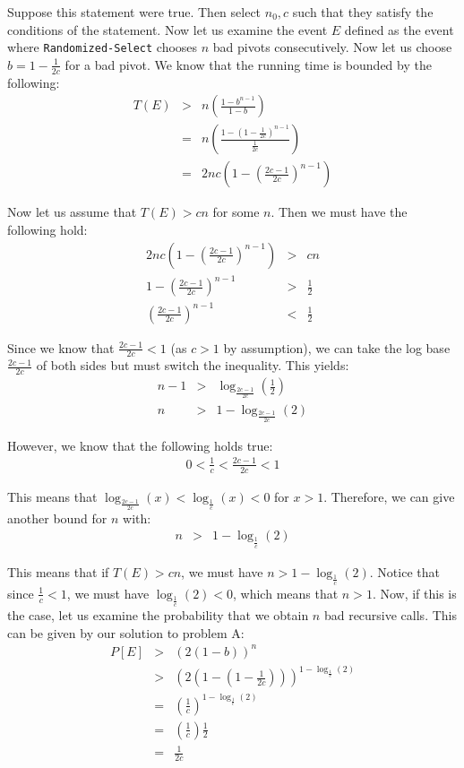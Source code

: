\documentclass[psamsfonts]{amsart}
\newenvironment{sol}{{\bfseries Solution}}{\qedsymbol}
\theoremstyle{definition}
\theoremstyle{remark}
\numberwithin{equation}{section}
\begin{document}
\begin{sol}
Suppose this statement were true. Then select $n_0, c$ such that they satisfy the conditions of the statement. Now let us examine the event $E$ defined as the event where \texttt{Randomized-Select} chooses $n$ bad pivots consecutively. Now let us choose $b = 1 - \frac{1}{2c}$ for a bad pivot. We know that the running time is bounded by the following:
\begin{eqnarray}
T(E) &>& n \left( \frac{1 - b^{n-1}}{1 - b} \right) \\
&=& n \left( \frac{1 - (1 - \frac{1}{2c})^{n-1}}{\frac{1}{2c}} \right) \\
&=& 2nc \left(1 - \left(\frac{2c - 1}{2c}\right)^{n-1} \right)
\end{eqnarray} 

Now let us assume that $T(E) > cn$ for some $n$. Then we must have the following hold:
\begin{eqnarray}
2nc \left(1 - \left(\frac{2c - 1}{2c}\right)^{n-1} \right) &>& cn \\
1 - \left(\frac{2c - 1}{2c}\right)^{n-1}&>& \frac{1}{2} \\
\left(\frac{2c - 1}{2c}\right)^{n-1} &<& \frac{1}{2}
\end{eqnarray}

Since we know that $\frac{2c-1}{2c} < 1$ (as $c > 1$ by assumption), we can take the log base $\frac{2c - 1}{2c}$ of both sides but must switch the inequality. This yields:
\begin{eqnarray}
n - 1 &>& \log_{\frac{2c - 1}{2c}} \left(\frac{1}{2} \right) \\
n &>& 1 - \log_{\frac{2c - 1}{2c}}(2)
\end{eqnarray} 

However, we know that the following holds true:
\begin{eqnarray}
0 < \frac{1}{c} < \frac{2c-1}{2c} < 1
\end{eqnarray}

This means that $\log_{\frac{2c-1}{2c}}(x) < \log_{\frac{1}{c}}(x)  <  0$ for $x > 1$. Therefore, we can give another bound for $n$ with:
\begin{eqnarray}
n &>& 1 - \log_{\frac{1}{c}}(2)
\end{eqnarray}

This means that if $T(E) > cn$, we must have $n > 1 - \log_{\frac{1}{c}}(2)$. Notice that since $\frac{1}{c} < 1$, we must have $ \log_{\frac{1}{c}}(2) < 0$, which means that $n > 1$. Now, if this is the case, let us examine the probability that we obtain $n$ bad recursive calls. This can be given by our solution to problem A:
\begin{eqnarray}
P[E] &>& (2(1-b))^{n} \\
&>& \left(2 \left(1- \left(1-\frac{1}{2c} \right) \right) \right)^{1 - \log_{{\frac{1}{c}}}(2)} \\
&=& \left(\frac{1}{c} \right)^{1 - \log_{\frac{1}{c}}(2)} \\
&=& \left(\frac{1}{c} \right) \frac{1}{2} \\
&=& \frac{1}{2c}
\end{eqnarray}


\end{sol}
\end{document}
